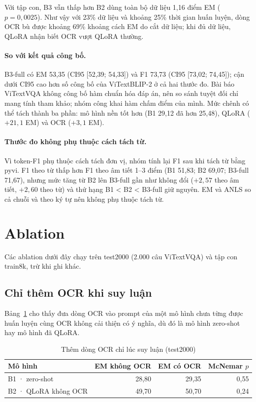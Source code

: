 Với tập con, B3 vẫn thấp hơn B2 dùng toàn bộ dữ liệu 1,16 điểm EM
($p = 0{,}0025$). Như vậy với 23\% dữ liệu và khoảng 25\% thời gian huấn luyện,
dòng OCR bù được khoảng 69\% khoảng cách EM do cắt dữ liệu; khi đủ dữ liệu, QLoRA
nhận biết OCR vượt QLoRA thường.

\paragraph{So với kết quả công bố.} B3-full có EM 53,35 (CI95 [52,39; 54,33]) và
F1 73,73 (CI95 [73,02; 74,45]); cận dưới CI95 cao hơn số công bố của
ViTextBLIP-2 ở cả hai thước đo. Bài báo ViTextVQA không công bố hàm chuẩn hóa đáp
án, nên so sánh tuyệt đối chỉ mang tính tham khảo; nhóm công khai hàm chấm điểm
của mình. Mức chênh có thể tách thành ba phần: mô hình nền tốt hơn (B1 29,12 đã
hơn 25,48), QLoRA ($+21{,}1$ EM) và OCR ($+3{,}1$ EM).

\paragraph{Thước đo không phụ thuộc cách tách từ.} Vì token-F1 phụ thuộc cách
tách đơn vị, nhóm tính lại F1 sau khi tách từ bằng pyvi. F1 theo từ thấp hơn F1
theo âm tiết 1--3 điểm (B1 51,83; B2 69,07; B3-full 71,67), nhưng mức tăng từ B2
lên B3-full gần như không đổi ($+2{,}57$ theo âm tiết, $+2{,}60$ theo từ) và thứ
hạng B1 < B2 < B3-full giữ nguyên. EM và ANLS so cả chuỗi và theo ký tự nên không
phụ thuộc tách từ.

\section{Ablation}
\label{sec:res-ablation}

Các ablation dưới đây chạy trên test2000 (2.000 câu ViTextVQA) và tập con
train8k, trừ khi ghi khác.

\subsection{Chỉ thêm OCR khi suy luận}
\label{sec:res-promptonly}

Bảng~\ref{tab:res-promptonly} cho thấy đưa dòng OCR vào prompt của một mô hình
chưa từng được huấn luyện cùng OCR không cải thiện có ý nghĩa, dù đó là mô hình
zero-shot hay mô hình đã QLoRA.

\begin{table}[htbp]
\caption{Thêm dòng OCR chỉ lúc suy luận (test2000)}
\label{tab:res-promptonly}
\centering
\small
\begin{tabular}{lrrr}
\toprule
\textbf{Mô hình} & \textbf{EM không OCR} & \textbf{EM có OCR} & \textbf{McNemar $p$} \\
\midrule
B1 · zero-shot & 28,80 & 29,35 & 0,55 \\
B2 · QLoRA không OCR & 49,70 & 50,70 & 0,24 \\
\bottomrule
\end{tabular}
\end{table}

